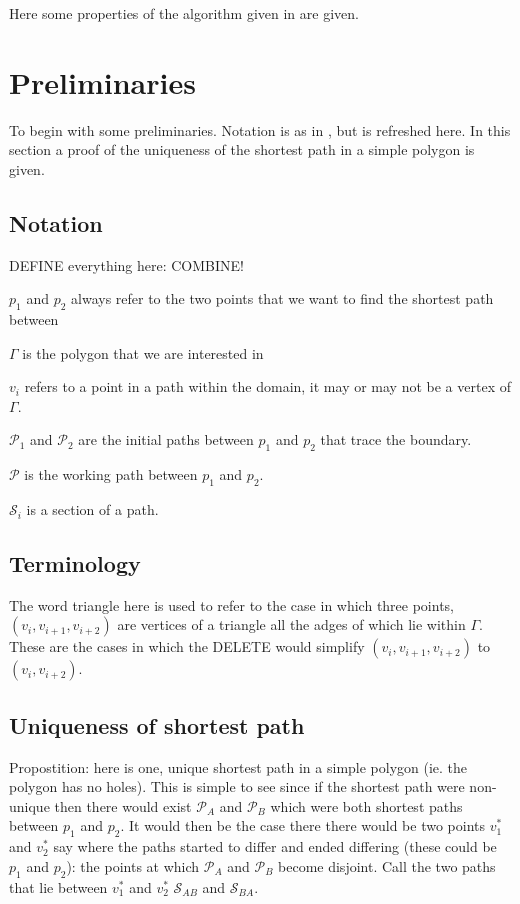 \label{chap-WAD}


Here some properties of the algorithm given in  are given.

\section{Preliminaries}

To begin with some preliminaries. Notation is as in , but is refreshed here. In this section a proof of the uniqueness of the shortest path in a simple polygon is given.

\subsection{Notation}

DEFINE everything here: COMBINE!

$p_1$ and $p_2$ always refer to the two points that we want to find the shortest path between

$\Gamma$ is the polygon that we are interested in

$v_i$ refers to a point in a path within the domain, it may or may not be a vertex of $\Gamma$.

$\mathcal{P}_1$ and $\mathcal{P}_2$ are the initial paths between $p_1$ and $p_2$ that trace the boundary.

$\mathcal{P}$ is the working path between $p_1$ and $p_2$.


$\mathcal{S}_{i}$ is a section of a path.

\subsection{Terminology}

The word triangle here is used to refer to the case in which three points, $(v_i,v_{i+1},v_{i+2})$ are vertices of a triangle all the adges of which lie within $\Gamma$. These are the cases in which the DELETE would simplify $(v_i,v_{i+1},v_{i+2})$ to $(v_i,v_{i+2})$.


\subsection{Uniqueness of shortest path}
\label{app-unique-sp}
Propostition: here is one, unique shortest path in a simple polygon (ie. the polygon has no holes).
This is simple to see since if the shortest path were non-unique then there would exist $\mathcal{P}_A$ and  $\mathcal{P}_B$ which were both shortest paths between $p_1$ and $p_2$. It would then be the case there there would be two points $v_1^*$ and $v_2^*$ say where the paths started to differ and ended differing (these could be $p_1$ and $p_2$): the points at which $\mathcal{P}_A$ and  $\mathcal{P}_B$ become disjoint. Call the two paths that lie between $v_1^*$ and $v_2^*$ $\mathcal{S}_{AB}$ and $\mathcal{S}_{BA}$. 


